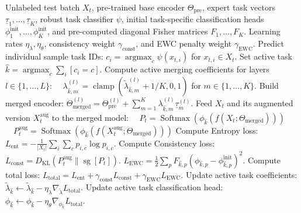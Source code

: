 \documentclass{article}
\theoremstyle{plain}
\theoremstyle{definition}
\theoremstyle{remark}
\begin{document}
\begin{algorithm}[tb]
  \caption{UEWC-Merge TTA Step}
  \label{alg:uewc_merge}
  \begin{algorithmic}[1]
     Unlabeled test batch $X_t$, pre-trained base encoder $\Theta_{\text{pre}}$, expert task vectors $\underline{\tau}_1, \dots, \underline{\tau}_K$, robust task classifier $\psi$, initial task-specific classification heads $\phi_1^{\text{init}}, \dots, \phi_K^{\text{init}}$, and pre-computed diagonal Fisher matrices $F_1, \dots, F_K$.
     Learning rates $\eta_{\lambda}, \eta_{\theta}$, consistency weight $\gamma_{\text{const}}$, and EWC penalty weight $\gamma_{\text{EWC}}$.
    \STATE Predict individual sample task IDs: $c_i = \operatorname{argmax}_c \psi(x_{t, i})$ for $x_{t,i} \in X_t$.
    \STATE Set active task $\hat{k} = \operatorname{argmax}_c \sum_{i} [c_i = c]$.
    \STATE Compute active merging coefficients for layers $l \in \{1,\dots,L\}$:
    \STATE $\quad \lambda_{\hat{k}, m}^{(l)} = \operatorname{clamp}(\tilde{\lambda}_{\hat{k}, m}^{(l)} + 1/K, 0, 1)$ for $m \in \{1,\dots,K\}$.
    \STATE Build merged encoder: $\Theta_{\text{merged}}^{(l)} = \Theta_{\text{pre}}^{(l)} + \sum_{m=1}^K \lambda_{\hat{k}, m}^{(l)} \underline{\tau}_m^{(l)}$.
    \STATE Feed $X_t$ and its augmented version $X_t^{\text{aug}}$ to the merged model:
    \STATE $\quad P_t = \operatorname{Softmax}(\phi_{\hat{k}}(f(X_t; \Theta_{\text{merged}})))$
    \STATE $\quad P_t^{\text{aug}} = \operatorname{Softmax}(\phi_{\hat{k}}(f(X_t^{\text{aug}}; \Theta_{\text{merged}})))$
    \STATE Compute Entropy loss: $L_{\text{ent}} = -\frac{1}{|X_t|} \sum_{i} \sum_{c} p_{i, c} \log p_{i, c}$.
    \STATE Compute Consistency loss: $L_{\text{const}} = D_{\text{KL}}(P_t^{\text{aug}} \parallel \operatorname{sg}[P_t])$.
    \STATE $L_{\text{EWC}} = \frac{1}{2} \sum_{p} F_{\hat{k},p} (\phi_{\hat{k},p} - \phi_{\hat{k},p}^{\text{init}})^2$.
    \STATE Compute total loss: $L_{\text{total}} = L_{\text{ent}} + \gamma_{\text{const}} L_{\text{const}} + \gamma_{\text{EWC}} L_{\text{EWC}}$.
    \STATE Update active task coefficients: $\tilde{\lambda}_{\hat{k}} \leftarrow \tilde{\lambda}_{\hat{k}} - \eta_{\lambda} \nabla_{\tilde{\lambda}} L_{\text{total}}$.
    \STATE Update active task classification head: $\phi_{\hat{k}} \leftarrow \phi_{\hat{k}} - \eta_{\theta} \nabla_{\phi_{\hat{k}}} L_{\text{total}}$.
  \end{algorithmic}
\end{algorithm}
\end{document}
